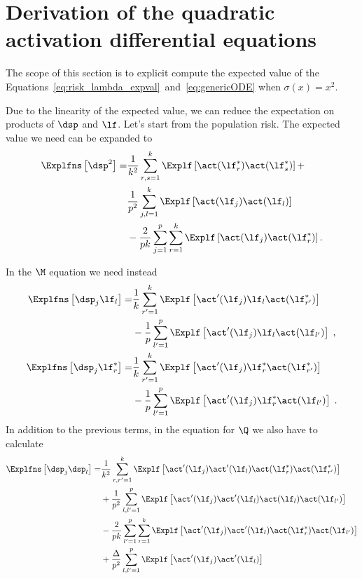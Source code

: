 \chapter[Derivation of the quadratic activation ODEs]{Derivation of the quadratic activation differential equations}
\label{app:derivation-quadratic-ode}

The scope of this section is to explicit compute the expected value of the
Equations~\eqref{eq:risk_lambda_expval}~and~\eqref{eq:genericODE} when \(\sigma(x) = x^2\).

Due to the linearity of the expected value, we can reduce the expectation on products of \(\dsp\) and \(\lf\).
Let's start from the population risk. The expected value we need can be expanded to 
\[\begin{split}
  \Explfns \left[  \dsp^2  \right]  =&
    \frac{1}{k^2} \sum_{r, s =1}^k \Explf\left[ \act(\lf_{r}^*) \act(\lf_{s}^*)  \right] +
  \\
  & \frac{1}{p^2} \sum_{j, l =1}^k \Explf\left[ \act(\lf_{j}) \act(\lf_{l}) \right]
  \\
  & - \frac{2}{pk}  \sum_{j=1}^p \sum_{r=1}^k \Explf\left[ \act(\lf_{j}) \act(\lf_{r}^*) \right].
\end{split}\]

In the \(\M\) equation we need instead
\[\begin{split}
  \Explfns \left[  \dsp_{j} \lf_{l}  \right]  =&  
  \frac{1}{k} \sum_{r' =1}^{k} \Explf  \left[\act' (\lf_{j}) \lf_l \act( \lf_{r'}^{*}  )  \right]
   \\
   &  -  \frac{1}{p} \sum_{l' = 1}^{p} \Explf \left[ \act' (\lf_{j}) \lf_l   \act ( \lf_{l'}  ) \right] \;, 
  \\
   \Explfns   \left[  \dsp_{j} \lf_{r}^*  \right]  =&    \frac{1}{k} \sum_{r'=1}^{k}   \Explf   \left[\act' (\lf_{j}) \lf_{r}^* \act( \lf_{r'}^{*}  )  \right]
   \\
   &   -   \frac{1}{p} \sum_{l' = 1}^{p} \Explf \left[ \act' (\lf_{j}) \lf_{r}^*   \act ( \lf_{l'}  ) \right]  \;.
\end{split}\]
In addition to the previous terms, in the equation for \(\Q\) we also have to calculate
\[\begin{split}
  \Explfns \left[  \dsp_{j} \dsp_{l}  \right]  =&  
  \frac{1}{k^2} \sum_{ r ,  r' =1}^{k} \Explf  \left[\act' (\lf_{j}) 
  \act' (\lf_{l}) \act (\lf_{r}^*  ) \act ( \lf_{r'}^{*}  )  \right]  \\
  & + \frac{1}{p^2} \sum_{ l ,  l' =1}^{p} \Explf  \left[\act' (\lf_{j}) 
  \act' (\lf_{l}) \act (\lf_{l}  ) \act ( \lf_{l'}  )  \right]  \\ 
  & - \frac{2}{pk} \sum_{ l' =1}^{p} \sum_{ r =1}^{k} \Explf  \left[\act' (\lf_{j}) 
  \act' (\lf_{l}) \act (\lf_{r}^*  ) \act ( \lf_{l'}  )  \right]  \\
  & + \frac{\Delta}{p^2} \sum_{ l ,  l' =1}^{p} \Explf  \left[\act' (\lf_{j}) 
  \act' (\lf_{l})  \right]
\end{split}\]

